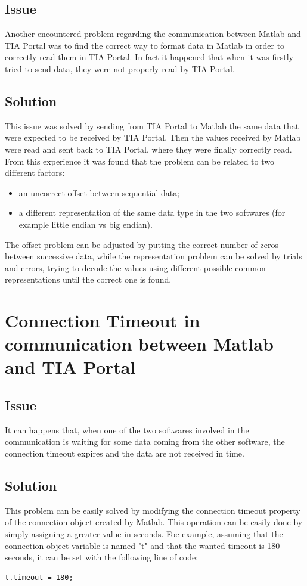 \subsection{Issue}
Another encountered problem regarding the communication between Matlab and TIA Portal was to find the correct way to format data in Matlab in order to correctly read them in TIA Portal. In fact it happened that when it was firstly tried to send data, they were not properly read by TIA Portal.

\subsection{Solution}
This issue was solved by sending from TIA Portal to Matlab the same data that were expected to be received by TIA Portal. Then the values received by Matlab were read and sent back to TIA Portal, where they were finally correctly read. From this experience it was found that the problem can be related to two different factors:
\begin{itemize}
    \item an uncorrect offset between sequential data;
    \item a different representation of the same data type in the two softwares (for example little endian vs big endian).
\end{itemize}
The offset problem can be adjusted by putting the correct number of zeros between successive data, while the representation problem can be solved by trials and errors, trying to decode the values using different possible  common representations until the correct one is found.

\section{Connection Timeout in communication between Matlab and TIA Portal}
\subsection{Issue}
It can happens that, when one of the two softwares involved in the communication is waiting for some data coming from the other software, the connection timeout expires and the data are not received in time.
\subsection{Solution}
This problem can be easily solved by modifying the connection timeout property of the connection object created by Matlab. This operation can be easily done by simply assigning a greater value in seconds. Foe example, assuming that the connection object variable is named "t" and that the wanted timeout is 180 seconds, it can be set with the following line of code:
\begin{lstlisting}[style=htmlcssjs,caption={Set connection timeout},label=code1]
t.timeout = 180;
\end{lstlisting}

